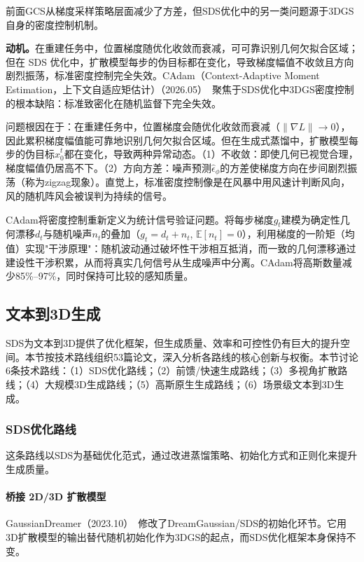 前面GCS从梯度采样策略层面减少了方差，但SDS优化中的另一类问题源于3DGS自身的密度控制机制。

\textbf{动机。}在重建任务中，位置梯度随优化收敛而衰减，可可靠识别几何欠拟合区域；但在 SDS 优化中，扩散模型每步的伪目标都在变化，导致梯度幅值不收敛且方向剧烈振荡，标准密度控制完全失效。CAdam（Context-Adaptive Moment Estimation，上下文自适应矩估计）（2026.05）~\cite{2605_20872}聚焦于SDS优化中3DGS密度控制的根本缺陷：标准致密化在随机监督下完全失效。

问题根因在于：在重建任务中，位置梯度会随优化收敛而衰减（$\|\nabla L\| \to 0$），因此累积梯度幅值能可靠地识别几何欠拟合区域。但在生成式蒸馏中，扩散模型每步的伪目标$\hat{x}_0^t$都在变化，导致两种异常动态。（1）不收敛：即使几何已视觉合理，梯度幅值仍居高不下。（2）方向方差：噪声预测$\hat{\epsilon}_\phi$的方差使梯度方向在步间剧烈振荡（称为zigzag现象）。直觉上，标准密度控制像是在风暴中用风速计判断风向，风的随机阵风会被误判为持续的信号。

CAdam将密度控制重新定义为统计信号验证问题。将每步梯度$g_t$建模为确定性几何漂移$d_t$与随机噪声$n_t$的叠加（$g_t = d_t + n_t$, $\mathbb{E}[n_t]=0$），利用梯度的一阶矩（均值）实现"干涉原理"：随机波动通过破坏性干涉相互抵消，而一致的几何漂移通过建设性干涉积累，从而将真实几何信号从生成噪声中分离。CAdam将高斯数量减少85\%--97\%，同时保持可比较的感知质量。

\subsection{文本到3D生成}
\label{sec:08_1_2}

SDS为文本到3D提供了优化框架，但生成质量、效率和可控性仍有巨大的提升空间。本节按技术路线组织53篇论文，深入分析各路线的核心创新与权衡。本节讨论6条技术路线：（1）SDS优化路线；（2）前馈/快速生成路线；（3）多视角扩散路线；（4）大规模3D生成路线；（5）高斯原生生成路线；（6）场景级文本到3D生成。

\subsubsection{SDS优化路线}

这条路线以SDS为基础优化范式，通过改进蒸馏策略、初始化方式和正则化来提升生成质量。

\paragraph{桥接 2D/3D 扩散模型}

GaussianDreamer（2023.10）~\cite{2310_08529}修改了DreamGaussian/SDS的初始化环节。它用3D扩散模型的输出替代随机初始化作为3DGS的起点，而SDS优化框架本身保持不变。

